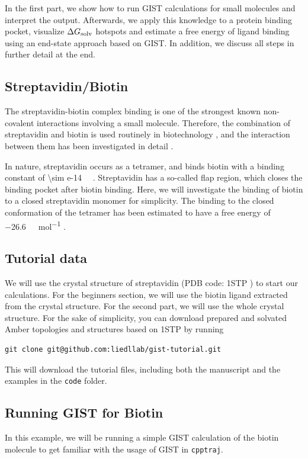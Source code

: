 \documentclass[9pt,tutorial]{livecoms}
\newcommand{\dgsolv}{\Delta G_\textup{solv}}
\newcommand{\software}{\texttt}
\newcommand\inlinecode{\texttt}
\begin{document}
In the first part, we show how to run GIST calculations for small molecules and interpret the output.
Afterwards, we apply this knowledge to a protein binding pocket, visualize $\dgsolv$ hotspots and estimate a free energy of ligand binding using an end-state approach based on GIST. In addition, we discuss all steps in further detail at the end. 

\subsection{Streptavidin/Biotin}
The streptavidin-biotin complex binding is one of the strongest known non-covalent interactions involving a small molecule.
Therefore, the combination of streptavidin and biotin is used routinely in biotechnology \cite{Dundas2013-streptavidin-review}, and the interaction between them has been investigated in detail \cite{McConnell2021-biotin}.

\newcommand{\appr}{{\mathord{\sim}}}
In nature, streptavidin occurs as a tetramer, and binds biotin with a binding constant of \SI{\sim e-14}{\per\Molar} \cite{Dundas2013-streptavidin-review}.
Streptavidin has a so-called flap region, which closes the binding pocket after biotin binding.
Here, we will investigate the binding of biotin to a closed streptavidin monomer for simplicity.
The binding to the closed conformation of the tetramer has been estimated to have a free energy of \SI{-26.6}{\kilo\calorie\per\mol} \cite{Bansal2018-biotin}.

\subsection{Tutorial data}
We will use the crystal structure of streptavidin (PDB code: 1STP \cite{Weber1989-streptavidin-structure}) to start our calculations.
For the beginners section, we will use the biotin ligand extracted from the crystal structure.
For the second part, we will use the whole crystal structure.
For the sake of simplicity, you can download prepared and solvated Amber topologies and structures based on 1STP by running
\begin{lstlisting}[style=bash]
git clone git@github.com:liedllab/gist-tutorial.git
\end{lstlisting}
This will download the tutorial files, including both the manuscript and the examples in the \inlinecode{code} folder.

\subsection{Running GIST for Biotin}
In this example, we will be running a simple GIST calculation of the biotin molecule to get familiar with the usage of GIST in \software{cpptraj}.
\end{document}
